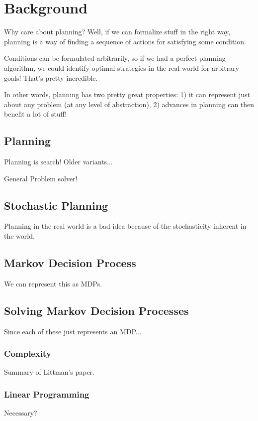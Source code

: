 \documentclass[11pt]{article}
\begin{document}
\section{Background}
\label{sec:background}

Why care about planning? Well, if we can formalize stuff in the right way, planning is a way of finding a sequence of actions for satisfying some condition.

Conditions can be formulated arbitrarily, so if we had a perfect planning algorithm, we could identify optimal strategies in the real world for arbitrary goals! That's pretty incredible.

In other words, planning has two pretty great properties: 1) it can represent just about any problem (at any level of abstraction), 2) advances in planning can then benefit a lot of stuff!

\subsection{Planning}

Planning is search! Older variants...

General Problem solver!

\subsection{Stochastic Planning}

Planning in the real world is a bad idea because of the stochasticity inherent in the world.

\subsection{Markov Decision Process}

We can represent this as MDPs.

\subsection{Solving Markov Decision Processes}

Since each of these just represents an MDP...

\subsubsection{Complexity}
Summary of Littman's paper.
\subsubsection{Linear Programming}
Necessary?
\end{document}
